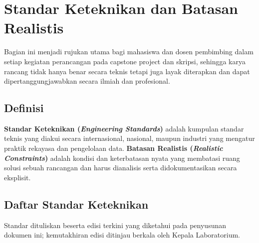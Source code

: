 \documentclass[12pt,a4paper]{report}
\begin{document}
\chapter{Standar Keteknikan dan Batasan Realistis}
\label{chap:standar}

Bagian ini menjadi rujukan utama bagi mahasiswa dan dosen pembimbing dalam setiap kegiatan perancangan pada capstone project dan skripsi, sehingga karya rancang tidak hanya benar secara teknis tetapi juga layak diterapkan dan dapat dipertanggungjawabkan secara il\-mi\-ah dan pro\-fe\-sio\-nal.

\section{Definisi}
\textbf{Standar Keteknikan (\emph{Engineering Standards})} adalah kumpulan standar teknis yang diakui secara internasional, nasional, maupun industri yang mengatur praktik rekayasa dan pengelolaan data. \textbf{Batasan Realistis (\emph{Realistic Constraints})} adalah kondisi dan keterbatasan nyata yang membatasi ruang solusi sebuah rancangan dan harus dianalisis serta didokumentasikan secara eksplisit.

\section{Daftar Standar Keteknikan}
Standar dituliskan beserta edisi terkini yang diketahui pada penyusunan dokumen ini; kemutakhiran edisi ditinjau berkala oleh Kepala Laboratorium.
\end{document}

